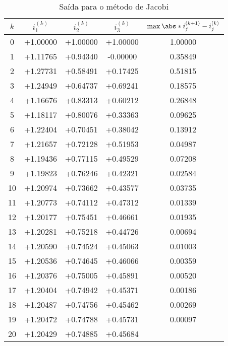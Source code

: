 \documentclass[portuguese,minted]{artigo}
\begin{document}
\begin{table}[H]
    \centering
    \caption{Saída para o método de Jacobi}
    \begin{tabular}{c c c c c}
        \toprule
        \(k\) & \(i^{(k)}_1\) & \(i^{(k)}_2\) & \(i^{(k)}_3\) & \(\max{\abs*{i^{(k+1)}_{j} - i^{(k)}_j}}\)\\
        \midrule
        0&+1.00000&+1.00000&+1.00000&1.00000\\
        1&+1.11765&+0.94340&-0.00000&0.35849\\
        2&+1.27731&+0.58491&+0.17425&0.51815\\
        3&+1.24949&+0.64737&+0.69241&0.18575\\
        4&+1.16676&+0.83313&+0.60212&0.26848\\
        5&+1.18117&+0.80076&+0.33363&0.09625\\
        6&+1.22404&+0.70451&+0.38042&0.13912\\
        7&+1.21657&+0.72128&+0.51953&0.04987\\
        8&+1.19436&+0.77115&+0.49529&0.07208\\
        9&+1.19823&+0.76246&+0.42321&0.02584\\
        10&+1.20974&+0.73662&+0.43577&0.03735\\
        11&+1.20773&+0.74112&+0.47312&0.01339\\
        12&+1.20177&+0.75451&+0.46661&0.01935\\
        13&+1.20281&+0.75218&+0.44726&0.00694\\
        14&+1.20590&+0.74524&+0.45063&0.01003\\
        15&+1.20536&+0.74645&+0.46066&0.00359\\
        16&+1.20376&+0.75005&+0.45891&0.00520\\
        17&+1.20404&+0.74942&+0.45371&0.00186\\
        18&+1.20487&+0.74756&+0.45462&0.00269\\
        19&+1.20472&+0.74788&+0.45731&0.00097\\
        20&+1.20429&+0.74885&+0.45684&\\
        \bottomrule
    \end{tabular}
    \label{tab:jacobi}
\end{table}
\end{document}

